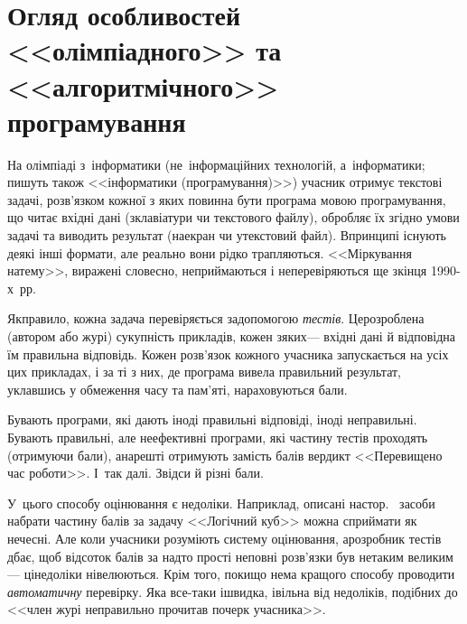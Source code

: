 \section{Огляд особливостей <<олімпіадного>> та <<алгоритмічного>> програмування}
\label{sec:FAQ}

На олімпіаді з~інформатики (не~інформаційних технологій, а~інформатики; пишуть також <<інформатики (програмування)>>) учасник отримує текстові задачі, розв'язком кожної з яких повинна бути програма мовою програмування, що читає вхідні дані (з\nolinebreak[3] клавіатури чи текстового файлу), обробляє їх згідно умови задачі та виводить результат (на\nolinebreak[3] екран чи у\nolinebreak[3] текстовий файл). В\nolinebreak[3] принципі існують деякі інші формати, але реально вони рідко трапляються. <<Міркування на\nolinebreak[3] тему>>, виражені словесно, не\nolinebreak[3] приймаються і не\nolinebreak[3] перевіряються ще з\nolinebreak[3] кінця \mbox{1990-х}~рр.

Як\nolinebreak[3] правило, кожна задача перевіряється за\nolinebreak[3] допомогою \emph{тестів}. Це\nolinebreak[2] розроблена (автором або журі) сукупність прикладів, кожен з\nolinebreak[1] яких\nolinebreak[3] --- вхідні дані й відповідна їм правильна відповідь. Кожен розв'язок кожного учасника запускається на усіх цих прикладах, і за ті з них, де програма вивела правильний результат, уклавшись у обмеження часу та пам'яті, нараховуються бали. 

Бувають програми, які дають іноді правильні відповіді, іноді неправильні. Бувають правильні, але неефективні програми, які частину тестів проходять (отримуючи бали), а\nolinebreak[2] на\nolinebreak[2] решті отримують замість балів вердикт <<Перевищено час роботи>>. І~так далі. Звідси й різні бали. 

У~цього способу оцінювання є недоліки. Наприклад, описані на\nolinebreak[2] стор.~\pageref{text:log-cube-how-to-get-part-of-points-easily} засоби набрати частину балів за задачу <<Логічний куб>> можна сприймати як нечесні. Але коли учасники розуміють систему оцінювання, а\nolinebreak[3] розробник тестів дбає, щоб відсоток балів за надто прості неповні розв'язки був не\nolinebreak[3] таким великим\nolinebreak[3] --- ці\nolinebreak[3] недоліки нівелюються. Крім того, поки\nolinebreak[3] що нема кращого способу проводити \emph{автоматичну} перевірку. Яка все-таки і\nolinebreak[3] швидка, і\nolinebreak[3] вільна від недоліків, подібних до <<член журі неправильно прочитав почерк учасника>>.

